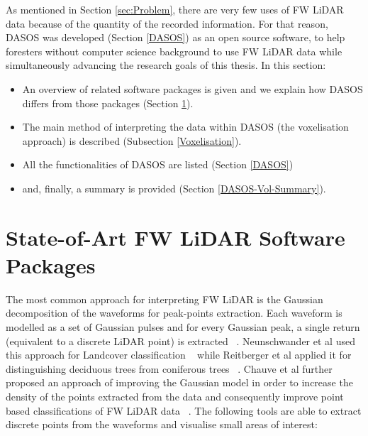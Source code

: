 \documentclass{subfiles}
\begin{document}
	
	\par As mentioned in Section \ref{sec:Problem}, there are very few uses of FW LiDAR data because of the quantity of the recorded information. For that reason, DASOS was developed (Section \ref{DASOS}) as an open source software, to help foresters without computer science background to use FW LiDAR data while simultaneously advancing the research goals of this thesis.  In this section:
	
	\begin{itemize}
		\item An overview of related software packages is given and we explain how DASOS differs from those packages (Section \ref{LiDARsoftwares}).
		\item The main method of interpreting the data within DASOS (the voxelisation approach) is described (Subsection \ref{Voxelisation}).
		\item All the functionalities of DASOS are listed (Section \ref{DASOS})
		\item and, finally, a summary is provided (Section \ref{DASOS-Vol-Summary}).
	\end{itemize}
	
	
	
	
	\section{State-of-Art FW LiDAR Software Packages}\label{LiDARsoftwares}
	
	\par {\color{blue}The most common approach for interpreting FW LiDAR is the Gaussian decomposition of the waveforms for peak-points extraction. Each waveform is modelled as a set of Gaussian pulses and for every Gaussian peak, a single return (equivalent to a discrete LiDAR point) is extracted} ~\cite{Wanger2006}. Neunschwander et al used this approach for Landcover classification ~\cite{Neuenschwander2009} while Reitberger et al applied it for distinguishing deciduous trees from coniferous trees ~\cite{Reitberger2008}. Chauve et al further proposed an approach of improving the Gaussian model in order to increase the density of the points extracted from the data and consequently improve point based classifications of FW LiDAR data ~\cite{Chauve2007}.  The following tools are able to extract discrete points from the waveforms and visualise small areas of interest:
\end{document}
